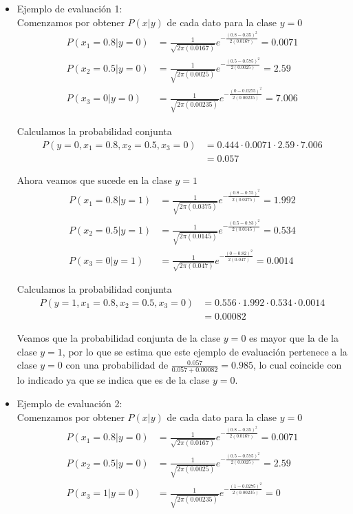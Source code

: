 \begin{itemize}
    \newpage

    \item Ejemplo de evaluación 1:\\
    Comenzamos por obtener $P(x|y)$ de cada dato para la clase $y=0$
    \begin{align*}
        P(x_1=0.8|y=0) & = \frac{1}{\sqrt{2\pi(0.0167)}} e^{-\frac{(0.8-0.35)^2}{2(0.0167)}} = 0.0071 \\
        P(x_2=0.5|y=0) & = \frac{1}{\sqrt{2\pi(0.0025)}} e^{-\frac{(0.5-0.575)^2}{2(0.0025)}} = 2.59 \\
        P(x_3=0|y=0) & = \frac{1}{\sqrt{2\pi(0.00235)}} e^{-\frac{(0-0.0275)^2}{2(0.00235)}} = 7.006
    \end{align*}

    Calculamos la probabilidad conjunta
    \begin{align*}
        P(y=0, x_1=0.8, x_2=0.5, x_3=0) & = 0.444 \cdot 0.0071 \cdot 2.59 \cdot 7.006 \\
        & = 0.057
    \end{align*}

    Ahora veamos que sucede en la clase $y=1$
    \begin{align*}
        P(x_1=0.8|y=1) & = \frac{1}{\sqrt{2\pi(0.0375)}} e^{-\frac{(0.8-0.75)^2}{2(0.0375)}} = 1.992 \\
        P(x_2=0.5|y=1) & = \frac{1}{\sqrt{2\pi(0.0145)}} e^{-\frac{(0.5-0.73)^2}{2(0.0145)}} = 0.534 \\
        P(x_3=0|y=1) & = \frac{1}{\sqrt{2\pi(0.047)}} e^{-\frac{(0-0.82)^2}{2(0.047)}} = 0.0014
    \end{align*}

    Calculamos la probabilidad conjunta
    \begin{align*}
        P(y=1, x_1=0.8, x_2=0.5, x_3=0) & = 0.556 \cdot 1.992 \cdot 0.534 \cdot 0.0014 \\
        & = 0.00082
    \end{align*}
    
    Veamos que la probabilidad conjunta de la clase $y=0$ es mayor que la de la clase $y=1$, por lo que se estima que este ejemplo de evaluación pertenece a la clase $y=0$ con una probabilidad de $\frac{0.057}{0.057 + 0.00082} = 0.985$, lo cual coincide con lo indicado ya que se indica que es de la clase $y=0$.
    \newpage

    \item Ejemplo de evaluación 2:\\
    Comenzamos por obtener $P(x|y)$ de cada dato para la clase $y=0$
    \begin{align*}
        P(x_1=0.8|y=0) & = \frac{1}{\sqrt{2\pi(0.0167)}} e^{-\frac{(0.8-0.35)^2}{2(0.0167)}} = 0.0071 \\
        P(x_2=0.5|y=0) & = \frac{1}{\sqrt{2\pi(0.0025)}} e^{-\frac{(0.5-0.575)^2}{2(0.0025)}} = 2.59 \\
        P(x_3=1|y=0) & = \frac{1}{\sqrt{2\pi(0.00235)}} e^{-\frac{(1-0.0275)^2}{2(0.00235)}} = 0
    \end{align*}


\end{itemize}
